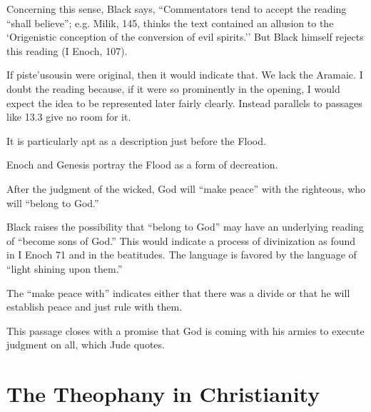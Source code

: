 \documentclass{beamer}
\begin{document}
\begin{frame}
  Concerning this sense, Black says, ``Commentators tend to accept the reading ``shall believe''; e.g.
  Milik, 145, thinks the text contained an allusion to the `Origenistic conception of the conversion of evil spirits.''
  But Black himself rejects this reading (I Enoch, 107).
\end{frame}

\begin{frame}
  If \textgreek{piste'usousin} were original, then it would indicate that.
  We lack the Aramaic.
  I doubt the reading because, if it were so prominently in the opening, I would expect the idea to be represented later fairly clearly.
  Instead parallels to passages like 13.3 give no room for it.
\end{frame}

\begin{frame}
  It is particularly apt as a description just before the Flood.
\end{frame}

\begin{frame}
  Enoch and Genesis portray the Flood as a form of decreation.
\end{frame}

\begin{frame}
  After the judgment of the wicked, God will ``make peace'' with the righteous, who will ``belong to God.''
\end{frame}

\begin{frame}
  Black raises the possibility that ``belong to God'' may have an underlying reading of ``become sons of God.''
  This would indicate a process of divinization as found in I Enoch 71 and in the beatitudes.
  The language is favored by the language of ``light shining upon them.''
\end{frame}

\begin{frame}
  The ``make peace with'' indicates either that there was a divide or that he will establish peace and just rule with them.
\end{frame}

\begin{frame}
  This passage closes with a promise that God is coming with his armies to execute judgment on all, which Jude quotes.
\end{frame}

\section{The Theophany in Christianity}
\end{document}
